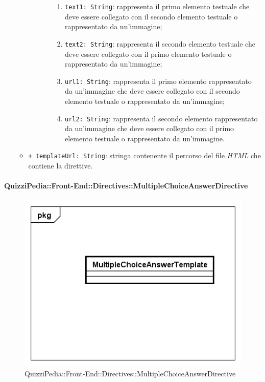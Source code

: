 \begin{itemize}
\begin{itemize}
\begin{itemize}
\begin{itemize}
						\begin{enumerate}
							\item \texttt{text1: String}: rappresenta il primo elemento testuale che deve essere collegato con il secondo elemento testuale o rappresentato da un’immagine;
							\item \texttt{text2: String}: rappresenta il secondo elemento testuale che deve essere collegato con il primo elemento testuale o rappresentato da un’immagine;
							\item \texttt{url1: String}: rappresenta il primo elemento rappresentato da un'immagine che deve essere collegato con il secondo elemento testuale o rappresentato da un’immagine;
							\item \texttt{url2: String}: rappresenta il secondo elemento rappresentato da un'immagine che deve essere collegato con il primo elemento testuale o rappresentato da un’immagine.
						\end{enumerate}
					\end{itemize}
				\end{itemize}
				\item \texttt{+ templateUrl: String}: stringa contenente il percorso del file \textit{HTML} che contiene la direttive.
					
			\end{itemize}
		\end{itemize}
		
		\paragraph{QuizziPedia::Front-End::Directives::MultipleChoiceAnswerDirective}
		
		\label{QuizziPedia::Front-End::Directives::MultipleChoiceAnswerDirective}
		
		\begin{figure}[ht]
			\centering
			\includegraphics[scale=0.80,keepaspectratio]{UML/Classi/Front-End/QuizziPedia_Front-end_Templates_MultipleChoiceAnswerTemplate.png}
			\caption{QuizziPedia::Front-End::Directives::MultipleChoiceAnswerDirective}
		\end{figure} \FloatBarrier
		

